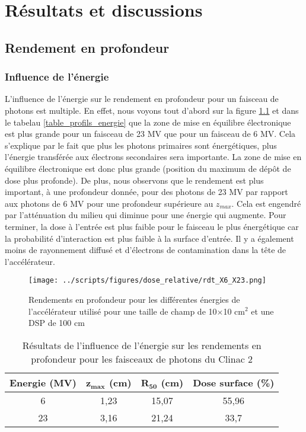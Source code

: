 \documentclass{book}
\begin{document}
\newpage

\chapter{Résultats et discussions}
\section{Rendement en profondeur}
\subsection{Influence de l'énergie}

L'influence de l'énergie sur le rendement en profondeur pour un faisceau de photons est multiple. En effet, nous voyons tout d'abord sur la figure \ref*{fig_rdt_energie} et dans le tabelau \ref*{table_profils_energie} que la zone de mise en équilibre électronique est plus grande pour un faisceau de 23 MV que pour un faisceau de 6 MV. Cela s'explique par le fait que plus les photons primaires sont énergétiques, plus l'énergie transférée aux électrons secondaires sera importante. La zone de mise en équilibre électronique est donc plus grande (position du maximum de dépôt de dose plus profonde). De plus, nous observons que le rendement est plus important, à une profondeur donnée, pour des photons de 23 MV par rapport aux photons de 6 MV pour une profondeur supérieure au $z_{max}$. Cela est engendré par l'atténuation du milieu qui diminue pour une énergie qui augmente. Pour terminer, la dose à l'entrée est plus faible pour le faisceau le plus énergétique car la probabilité d'interaction est plus faible à la surface d'entrée. Il y a également moins de rayonnement diffusé et d'électrons de contamination dans la tête de l'accélérateur.

\begin{figure}[h!]
  \centering
  \texttt{[image: ../scripts/figures/dose\_relative/rdt\_X6\_X23.png]}
  \caption{Rendements en profondeur pour les différentes énergies de l'accélérateur utilisé pour une taille de champ de 10$\times$10 cm$^2$ et une DSP de 100 cm}
  \label{fig_rdt_energie}
\end{figure}

\begin{table}[h]
  \centering
  \begin{tabular}{cccc}
    \toprule
    \textbf{Energie (MV)} & $\mathbf{z_{max}}$ \textbf{(cm)} & $\mathbf{R_{50}}$ \textbf{(cm)} & \textbf{Dose surface (\%)} \\
    \toprule
    6 & 1,23 & 15,07 & 55,96 \\
    23 & 3,16 & 21,24 & 33,7 \\
    \bottomrule
  \end{tabular}
  \caption{Résultats de l'influence de l'énergie sur les rendements en profondeur pour les faisceaux de photons du Clinac 2}
  \label{table_rdt_energie}
\end{table}
\end{document}
